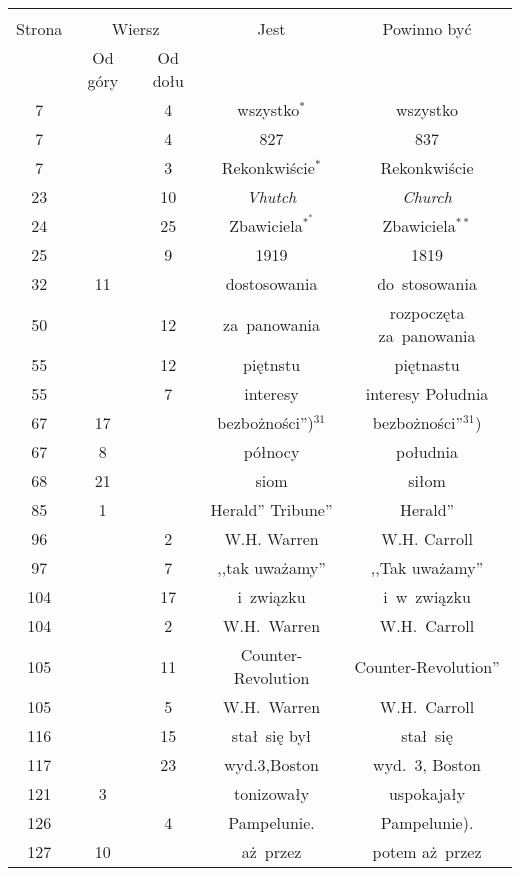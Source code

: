 \documentclass[a4paper,11pt]{article}
\begin{document}
\newpage
{}
\begin{center}
  \begin{tabular}{|c|c|c|c|c|}
    \hline
    & \multicolumn{2}{c|}{} & & \\
    Strona & \multicolumn{2}{c|}{Wiersz} & Jest
                              & Powinno być \\ \cline{2-3}
    & Od góry & Od dołu & & \\
    \hline
    7   & &  4 & wszystko$^{ * }$ & wszystko \\
    7   & &  4 & 827 & 837 \\
    7   & &  3 & Rekonkwiście$^{ * }$ & Rekonkwiście \\
    23  & & 10 & \emph{Vhutch} & \emph{Church} \\
    24  & & 25 & Zbawiciela$^{ *^{ * } }$ & Zbawiciela$^{ ** }$ \\
    25  & &  9 & 1919 & 1819 \\
    32  & 11 & & dostosowania & do~stosowania \\
    50  & & 12 & za~panowania & rozpoczęta za~panowania \\
    55  & & 12 & piętnstu & piętnastu \\
    55  & &  7 & interesy & interesy Południa \\
    67  & 17 & & bezbożności'')$^{ 31 }$ & bezbożności''$^{ 31 }$) \\
    67  &  8 & & północy & południa \\
    68  & 21 & & siom & siłom \\
    85  &  1 & & Herald'' Tribune'' & Herald'' \\
    96  & &  2 & W.H. Warren & W.H. Carroll \\
    97  & &  7 & ,,tak uważamy'' & ,,Tak uważamy'' \\
    104 & & 17 & i~związku & i~w~związku \\
    104 & &  2 & W.H.~Warren & W.H.~Carroll \\
    105 & & 11 & Counter-Revolution & Counter-Revolution'' \\
    105 & &  5 & W.H.~Warren & W.H.~Carroll \\
    116 & & 15 & stał~się był & stał~się \\
    117 & & 23 & wyd.3,Boston & wyd.~3, Boston \\
    121 &  3 & & tonizowały & uspokajały \\
    126 & &  4 & Pampelunie. & Pampelunie). \\
    127 & 10 & & aż~przez & potem aż~przez \\

\end{tabular}
\end{center}
\end{document}
